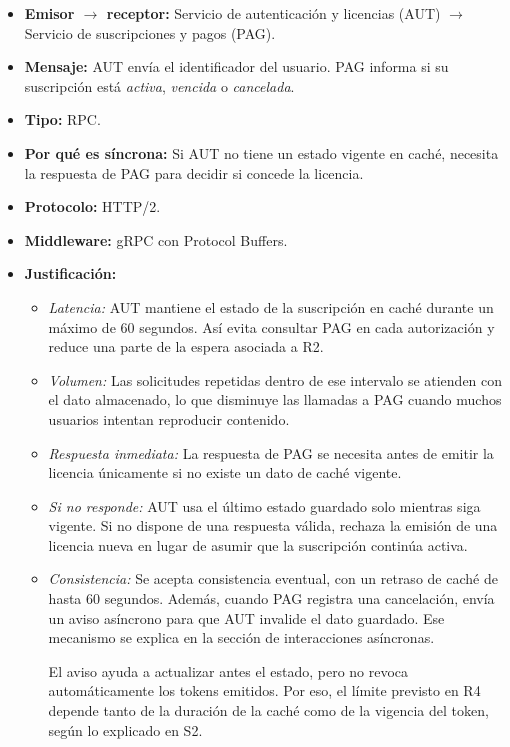 \begin{itemize}
    \item \textbf{Emisor $\rightarrow$ receptor:}
    Servicio de autenticación y licencias (AUT) $\rightarrow$ Servicio de suscripciones y pagos (PAG).

    \item \textbf{Mensaje:}
    AUT envía el identificador del usuario. PAG informa si su suscripción está \emph{activa}, \emph{vencida} o \emph{cancelada}.

    \item \textbf{Tipo:} RPC.

    \item \textbf{Por qué es síncrona:}
    Si AUT no tiene un estado vigente en caché, necesita la respuesta de PAG para decidir si concede la licencia.

    \item \textbf{Protocolo:} HTTP/2.

    \item \textbf{Middleware:} gRPC con Protocol Buffers.

    \item \textbf{Justificación:}
    \begin{itemize}
        \item \textit{Latencia:}
        AUT mantiene el estado de la suscripción en caché durante un máximo de 60 segundos. Así evita consultar PAG en cada autorización y reduce una parte de la espera asociada a R2.

        \item \textit{Volumen:}
        Las solicitudes repetidas dentro de ese intervalo se atienden con el dato almacenado, lo que disminuye las llamadas a PAG cuando muchos usuarios intentan reproducir contenido.

        \item \textit{Respuesta inmediata:}
        La respuesta de PAG se necesita antes de emitir la licencia únicamente si no existe un dato de caché vigente.

        \item \textit{Si no responde:}
        AUT usa el último estado guardado solo mientras siga vigente. Si no dispone de una respuesta válida, rechaza la emisión de una licencia nueva en lugar de asumir que la suscripción continúa activa.

        \item \textit{Consistencia:}
        Se acepta consistencia eventual, con un retraso de caché de hasta 60 segundos. Además, cuando PAG registra una cancelación, envía un aviso asíncrono para que AUT invalide el dato guardado. Ese mecanismo se explica en la sección de interacciones asíncronas.

        El aviso ayuda a actualizar antes el estado, pero no revoca automáticamente los tokens emitidos. Por eso, el límite previsto en R4 depende tanto de la duración de la caché como de la vigencia del token, según lo explicado en S2.
    \end{itemize}
\end{itemize}


